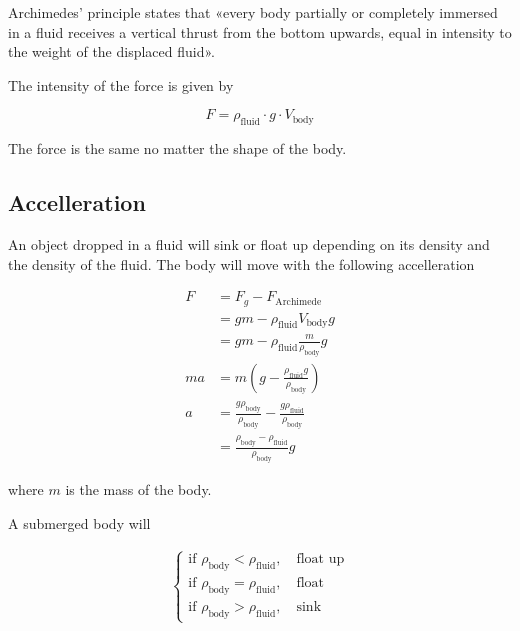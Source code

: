 \documentclass[a4paper]{article}
\begin{document}
Archimedes' principle states that
«every body partially or completely immersed in a fluid receives a
vertical thrust from the bottom upwards,
equal in intensity to the weight of the displaced fluid».

The intensity of the force is given by

\[
    F = \rho_\text{fluid} \cdot g \cdot V_\text{body}
\]

The force is the same no matter the shape of the body.

\subsection{Accelleration}

An object dropped in a fluid will sink or float up
depending on its density and the density of the fluid.
The body will move with the following accelleration

\begin{align*}
    F &= F_g - F_\text{Archimede} \\
    &= gm - \rho_\text{fluid}V_\text{body}g \\
    &= gm - \rho_\text{fluid}\frac{m}{\rho_\text{body}}g \\
    ma &= m \left( g- \frac{\rho_\text{fluid}g}{\rho_\text{body}} \right) \\
    a &= \frac{g\rho_\text{body}}{\rho_\text{body}} - \frac{g\rho_\text{fluid}}{\rho_\text{body}} \\
    &= \frac{\rho_\text{body} - \rho_\text{fluid}}{\rho_\text{body}}g
\end{align*}

where \(m\) is the mass of the body.

A submerged body will

\begin{align*}
	\begin{cases}
        \text{if } \rho_\text{body} < \rho_\text{fluid},\quad \text{float up} \\
        \text{if } \rho_\text{body} = \rho_\text{fluid},\quad \text{float} \\
        \text{if } \rho_\text{body} > \rho_\text{fluid},\quad \text{sink}
	\end{cases}
\end{align*}

\pagebreak
\end{document}
